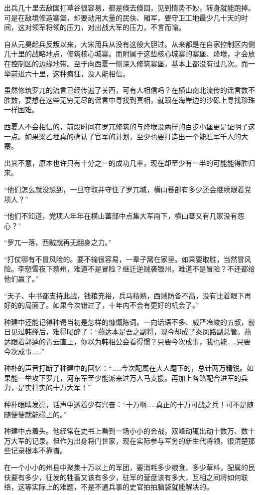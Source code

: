出兵几十里去敌国打草谷很容易，都是倏去倏回，见到情势不妙，转身就能跑掉。可是在敌境修造寨堡，却要动用大量的民伕、厢军，要守卫工地最少几十天的时间，这对领军将领的压力，对出战大军的压力，不言而喻。

自从元昊起兵反叛以来，大宋用兵从没有这般大胆过。从来都是在自家控制区内侧几十里的战略地点，修筑核心城寨。而附属于这些核心城寨的寨堡、烽堠，才会放在控制区的边缘地带。至于向西夏一侧深入修筑寨堡，基本上都没有过几次。而一举前进六十里，这种疯狂，没人能相信。

虽然修筑罗兀的流言已经传遍了关西，可有人相信吗？在横山南北流传的谣言数不胜数，要想在这些无穷无尽的谣言中寻找到真相，就跟在海岸边的沙砾上寻找珍珠一样困难。

西夏人不会相信的，前段时间在罗兀修筑的与烽堠没两样的百步小堡更是证明了这一点。如果梁乙埋真的确认了官军的计划，至少也要打造出一个能驻军千人的大寨。

出其不意，原本也许只有十分之一的成功几率，现在却至少有一半的可能能得胜归来。

“他们怎么就没想到，一旦夺取并守住了罗兀城，横山蕃部有多少还会继续跟着党项人？”

“他们不知道，党项人年年在横山蕃部中点集大军南下，横山蕃又有几家没有怨心？”

“罗兀一落，西贼就再无翻身之力。”

“打仗哪有不冒风险的。要不输很容易，一辈子窝在家里。如果要取胜，当然冒风险。李愬雪夜下蔡州，难道不是冒险？继迁逆贼袭银州，难道不是冒险？不还都给他们赢了。”

“天子、中书都支持此战，钱粮充裕，兵马精熟，西贼防备不高，没有比着眼下再好的的局面了。如果今次错过了，十年内不会有更好的机会了。”

种建中还能记得种谔当初是怎样的慷慨陈词。一向话语不多、威严冷峻的五叔，前日见过韩绛后，难得喝醉了：“燕达本是吾之副将，现今却成了秦凤路副总管。燕达跟着郭逵的青云直上，你以为韩相公会看得惯？只要今次成事，我也能……只要今次成事……”

种朴的声音打断了种建中的回忆：“……今次配属在大人麾下的，总计两万精锐。如果能一举攻下罗兀，河东军至少能派来过万人马支援。再加上各路配合进军的兵力，是实打实的十万大军！”

种朴眼睛发亮，话声中透着少有兴奋：“十万啊……真正的十万可战之兵！可不是随随便便就能碰上的。”

种建中点着头。他经常在史书上看到一场小小的会战，双峰动辄出动十数万、数十万大军的记录。但作为出身将门世家，现在实际参与军务的新生代将领，很清楚那些记录根本不靠谱。

在一个小小的州县中聚集十万以上的军团，要消耗多少粮食，多少草料，配属的民伕要有多少，征发的牲畜又该有多少，驻军的营盘该有多大，互相之间将如何联络，这等实际上的难题，不是不通兵事的史官拍拍脑袋就能解决的。

